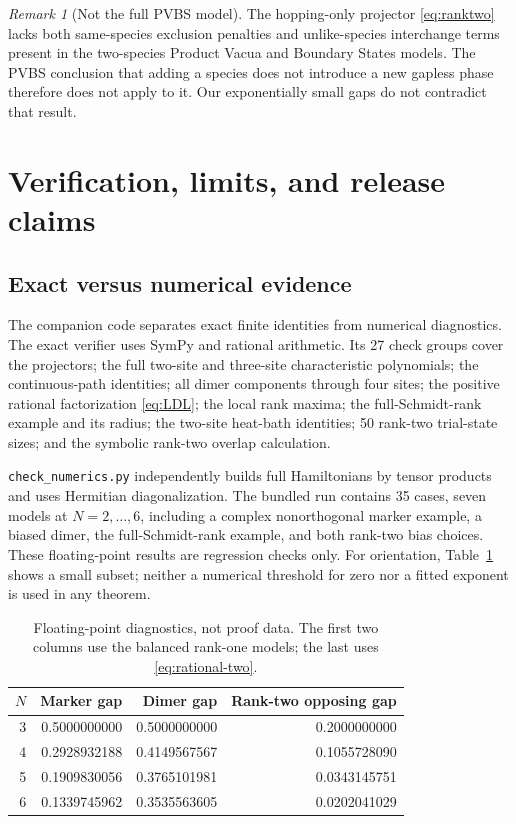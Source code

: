 \documentclass[11pt,a4paper]{article}
\theoremstyle{remark}\newtheorem{remark}[theorem]{Remark}
\begin{document}
\begin{remark}[Not the full PVBS model]
The hopping-only projector \eqref{eq:ranktwo} lacks both same-species exclusion penalties and unlike-species interchange terms present in the two-species Product Vacua and Boundary States models. The PVBS conclusion that adding a species does not introduce a new gapless phase \cite{Bishop} therefore does not apply to it. Our exponentially small gaps do not contradict that result.
\end{remark}

\section{Verification, limits, and release claims}
\subsection{Exact versus numerical evidence}
The companion code separates exact finite identities from numerical diagnostics. The exact verifier uses SymPy and rational arithmetic. Its 27 check groups cover the projectors; the full two-site and three-site characteristic polynomials; the continuous-path identities; all dimer components through four sites; the positive rational factorization \eqref{eq:LDL}; the local rank maxima; the full-Schmidt-rank example and its radius; the two-site heat-bath identities; 50 rank-two trial-state sizes; and the symbolic rank-two overlap calculation.

\texttt{check\_numerics.py} independently builds full Hamiltonians by tensor products and uses Hermitian diagonalization. The bundled run contains 35 cases, seven models at $N=2,\ldots,6$, including a complex nonorthogonal marker example, a biased dimer, the full-Schmidt-rank example, and both rank-two bias choices. These floating-point results are regression checks only. For orientation, Table~\ref{tab:numerics} shows a small subset; neither a numerical threshold for zero nor a fitted exponent is used in any theorem.
\begin{table}[ht]
\centering
\begin{tabular}{@{}rrrr@{}}\toprule
$N$ & Marker gap & Dimer gap & Rank-two opposing gap\\\midrule
3&0.5000000000&0.5000000000&0.2000000000\\
4&0.2928932188&0.4149567567&0.1055728090\\
5&0.1909830056&0.3765101981&0.0343145751\\
6&0.1339745962&0.3535563605&0.0202041029\\\bottomrule
\end{tabular}
\caption{Floating-point diagnostics, not proof data. The first two columns use the balanced rank-one models; the last uses \eqref{eq:rational-two}.}\label{tab:numerics}
\end{table}
\end{document}
